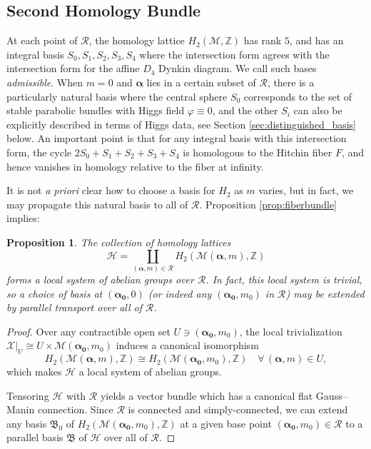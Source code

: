 \documentclass[12pt,letterpaper,reqno]{amsart}
\def\mathbf#1{#1}%
\newtheorem{prop}[thm]{Proposition}
\theoremstyle{remark}
\theoremstyle{definition}
\numberwithin{thm}{section}
\numberwithin{equation}{section}
\numberwithin{figure}{section}
\newcommand{\cM}{\ensuremath{\mathcal M}}
\newcommand{\Z}{\ensuremath{\mathbb Z}}
\newcommand{\calR}{\mathcal R}
\newcommand{\RR}{{\mathcal R}}
\newcommand{\bsa}{\boldsymbol{\alpha}}
\newcommand{\bfm}{\mathbf{m}}
\begin{document}
\subsection{Second Homology Bundle}
At each point of $\mathcal R$, the homology lattice $H_2(\cM, \Z)$ has rank $5$, and has an integral basis $S_0, S_1, S_2, S_3, S_4$ 
where the intersection form agrees with the intersection form for the affine $D_4$ Dynkin diagram. We call such bases {\it admissible}.
When $\bfm = \mathbf{0}$ and $\bsa$
lies in a certain subset of $\calR$, there is a particularly natural basis where the central sphere $S_0$ corresponds to the set of stable
parabolic bundles with Higgs field $\varphi \equiv 0$, and the other $S_i$ can also be explicitly described in terms of Higgs data, see Section \ref{sec:distinguished_basis} below.
An important point is that for any integral basis with this intersection form, the cycle $2S_0 + S_1 + S_2 + S_3 + S_4$ is homologous
to the Hitchin fiber $F$, and hence vanishes in homology relative to the fiber at infinity. 

It is not \emph{a priori} clear how to choose a basis for $H_2$ as $\bfm$ varies, but in fact, we may propagate this natural basis to all of $\calR$.
Proposition \ref{prop:fiberbundle} implies:
\begin{prop}\label{prop:localsystem}
The collection of homology lattices
$$ 
\mathcal{H} = \coprod_{(\boldsymbol{\alpha}, \mathbf{m}) \in \mathcal{R}}H_2(\mathcal{M}(\boldsymbol{\alpha}, \mathbf{m}),\Z)
$$ 
forms a local system of abelian groups over $\calR$.  In fact, this local system is trivial, so a choice of basis at 
$(\boldsymbol{\alpha_0}, \mathbf{0})$ (or indeed any $(\boldsymbol{\alpha_0}, \mathbf{m_0})$ in $\calR$) may be extended
by parallel transport over all of $\calR$.
\end{prop}
\begin{proof}
Over any contractible open set $U \ni (\boldsymbol{\alpha_0}, \mathbf{m_0})$, the local trivialization $\mathcal{X}|_U  \cong U \times \mathcal{M}(\boldsymbol{\alpha_0},
\mathbf{m_0})$ induces a canonical isomorphism
\[
H_2(\mathcal{M}(\boldsymbol{\alpha}, \mathbf{m}),\Z) \cong H_2(\mathcal{M}(\boldsymbol{\alpha_0}, \mathbf{m_0}),\Z) \quad 
\forall \,(\boldsymbol{\alpha}, \mathbf{m}) \in U,
\]
which makes $\mathcal{H}$ a local system of abelian groups.

Tensoring $\mathcal H$ with $\RR$ yields a vector bundle which has a canonical flat Gauss--Manin connection. Since $\calR$ is connected and simply-connected, 
we can extend any basis $\mathfrak{B}_0 $ of $H_2(\mathcal{M}(\boldsymbol{\alpha_0}, \mathbf{m_0}),\Z)$ at a given base point 
$(\boldsymbol{\alpha_0}, \mathbf{m_0}) \in \mathcal{R}$ to a parallel basis $\mathfrak B$ of $\mathcal{H}$ over all of $\calR$. 
\end{proof}
\end{document}
